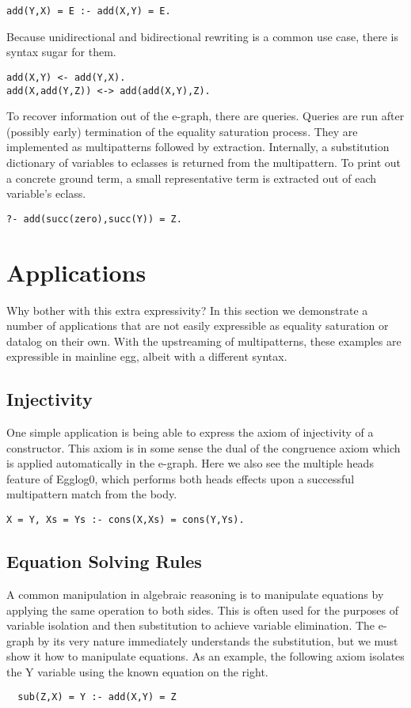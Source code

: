 \documentclass[sigplan,10pt,review,anonymous]{acmart}
\begin{document}
\begin{lstlisting}
add(Y,X) = E :- add(X,Y) = E.
\end{lstlisting}

Because unidirectional and bidirectional rewriting is a common use case, there is syntax sugar for them.

\begin{lstlisting}
add(X,Y) <- add(Y,X).
add(X,add(Y,Z)) <-> add(add(X,Y),Z).
\end{lstlisting}

To recover information out of the e-graph, there are queries. Queries are run after (possibly early) termination of the equality saturation process. They are implemented as multipatterns followed by extraction. Internally, a substitution dictionary of variables to eclasses is returned from the multipattern. To print out a concrete ground term, a small representative term is extracted out of each variable's eclass.

\begin{lstlisting}
?- add(succ(zero),succ(Y)) = Z.
\end{lstlisting}

\section{Applications}
Why bother with this extra expressivity? In this section we demonstrate a number of applications that are not easily expressible as equality saturation or datalog on their own. With the upstreaming of multipatterns, these examples are expressible in mainline egg, albeit with a different syntax.

\subsection{Injectivity}
One simple application is being able to express the axiom of injectivity of a constructor. This axiom is in some sense the dual of the congruence axiom which is applied automatically in the e-graph. Here we also see the multiple heads feature of Egglog0, which performs both heads effects upon a successful multipattern match from the body.

\begin{lstlisting}
X = Y, Xs = Ys :- cons(X,Xs) = cons(Y,Ys).
\end{lstlisting}

\subsection{Equation Solving Rules}
A common manipulation in algebraic reasoning is to manipulate equations by applying the same operation to both sides. This is often used for the purposes of variable isolation and then substitution to achieve variable elimination. The e-graph by its very nature immediately understands the substitution, but we must show it how to manipulate equations. As an example, the following axiom isolates the Y variable using the known equation on the right. 
\begin{lstlisting}
  sub(Z,X) = Y :- add(X,Y) = Z
\end{lstlisting}
\end{document}
